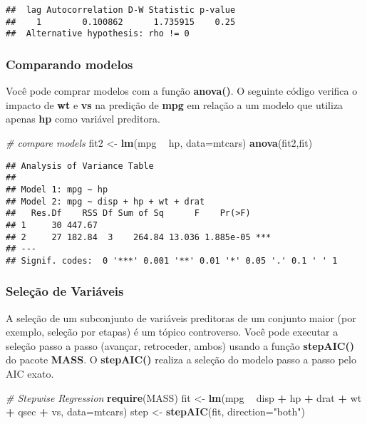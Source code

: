 \documentclass[]{article}
\newenvironment{Shaded}{\begin{snugshade}}{\end{snugshade}}
\newcommand{\CommentTok}[1]{\textcolor[rgb]{0.56,0.35,0.01}{\textit{#1}}}
\newcommand{\DataTypeTok}[1]{\textcolor[rgb]{0.13,0.29,0.53}{#1}}
\newcommand{\KeywordTok}[1]{\textcolor[rgb]{0.13,0.29,0.53}{\textbf{#1}}}
\newcommand{\NormalTok}[1]{#1}
\newcommand{\OperatorTok}[1]{\textcolor[rgb]{0.81,0.36,0.00}{\textbf{#1}}}
\newcommand{\StringTok}[1]{\textcolor[rgb]{0.31,0.60,0.02}{#1}}
\begin{document}
\begin{verbatim}
##  lag Autocorrelation D-W Statistic p-value
##    1        0.100862      1.735915    0.25
##  Alternative hypothesis: rho != 0
\end{verbatim}

\hypertarget{comparando-modelos}{%
\subsubsection{Comparando modelos}\label{comparando-modelos}}

Você pode comprar modelos com a função \textbf{anova()}. O seguinte
código verifica o impacto de \textbf{wt} e \textbf{vs} na predição de
\textbf{mpg} em relação a um modelo que utiliza apenas \textbf{hp} como
variável preditora.

\begin{Shaded}
\begin{Highlighting}[]
\CommentTok{# compare models}
\NormalTok{fit2 <-}\StringTok{ }\KeywordTok{lm}\NormalTok{(mpg }\OperatorTok{~}\StringTok{ }\NormalTok{hp, }\DataTypeTok{data=}\NormalTok{mtcars)}
\KeywordTok{anova}\NormalTok{(fit2,fit)}
\end{Highlighting}
\end{Shaded}

\begin{verbatim}
## Analysis of Variance Table
## 
## Model 1: mpg ~ hp
## Model 2: mpg ~ disp + hp + wt + drat
##   Res.Df    RSS Df Sum of Sq      F    Pr(>F)    
## 1     30 447.67                                  
## 2     27 182.84  3    264.84 13.036 1.885e-05 ***
## ---
## Signif. codes:  0 '***' 0.001 '**' 0.01 '*' 0.05 '.' 0.1 ' ' 1
\end{verbatim}

\hypertarget{seleuxe7uxe3o-de-variuxe1veis}{%
\subsubsection{Seleção de
Variáveis}\label{seleuxe7uxe3o-de-variuxe1veis}}

A seleção de um subconjunto de variáveis preditoras de um conjunto maior
(por exemplo, seleção por etapas) é um tópico controverso. Você pode
executar a seleção passo a passo (avançar, retroceder, ambos) usando a
função \textbf{stepAIC()} do pacote \textbf{MASS}. O \textbf{stepAIC()}
realiza a seleção do modelo passo a passo pelo AIC exato.

\begin{Shaded}
\begin{Highlighting}[]
\CommentTok{# Stepwise Regression}
\KeywordTok{require}\NormalTok{(MASS)}
\NormalTok{fit <-}\StringTok{ }\KeywordTok{lm}\NormalTok{(mpg }\OperatorTok{~}\StringTok{ }\NormalTok{disp }\OperatorTok{+}\StringTok{ }\NormalTok{hp }\OperatorTok{+}\StringTok{ }\NormalTok{drat }\OperatorTok{+}\StringTok{ }\NormalTok{wt }\OperatorTok{+}\StringTok{ }\NormalTok{qsec }\OperatorTok{+}\StringTok{ }\NormalTok{vs, }\DataTypeTok{data=}\NormalTok{mtcars)}
\NormalTok{step <-}\StringTok{ }\KeywordTok{stepAIC}\NormalTok{(fit, }\DataTypeTok{direction=}\StringTok{"both"}\NormalTok{)}
\end{Highlighting}
\end{Shaded}
\end{document}
